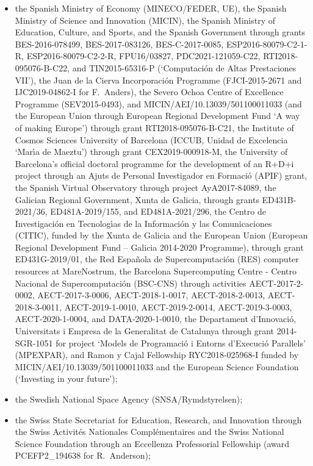 \documentclass{aa}
\begin{document}
\begin{appendix}
\begin{itemize}
\item the Spanish Ministry of Economy (MINECO/FEDER, UE), the Spanish Ministry of Science and Innovation (MICIN), the Spanish Ministry of Education, Culture, and Sports, and the Spanish Government through grants BES-2016-078499, BES-2017-083126, BES-C-2017-0085, ESP2016-80079-C2-1-R, ESP2016-80079-C2-2-R, FPU16/03827, PDC2021-121059-C22, RTI2018-095076-B-C22, and TIN2015-65316-P (`Computaci\'{o}n de Altas Prestaciones VII'), the Juan de la Cierva Incorporaci\'{o}n Programme (FJCI-2015-2671 and IJC2019-04862-I for F.~Anders), the Severo Ochoa Centre of Excellence Programme (SEV2015-0493), and MICIN/AEI/10.13039/501100011033 (and the European Union through European Regional Development Fund `A way of making Europe') through grant RTI2018-095076-B-C21, the Institute of Cosmos Sciences University of Barcelona (ICCUB, Unidad de Excelencia `Mar\'{\i}a de Maeztu’) through grant CEX2019-000918-M, the University of Barcelona's official doctoral programme for the development of an R+D+i project through an Ajuts de Personal Investigador en Formaci\'{o} (APIF) grant, the Spanish Virtual Observatory through project AyA2017-84089, the Galician Regional Government, Xunta de Galicia, through grants ED431B-2021/36, ED481A-2019/155, and ED481A-2021/296, the Centro de Investigaci\'{o}n en Tecnolog\'{\i}as de la Informaci\'{o}n y las Comunicaciones (CITIC), funded by the Xunta de Galicia and the European Union (European Regional Development Fund -- Galicia 2014-2020 Programme), through grant ED431G-2019/01, the Red Espa\~{n}ola de Supercomputaci\'{o}n (RES) computer resources at MareNostrum, the Barcelona Supercomputing Centre - Centro Nacional de Supercomputaci\'{o}n (BSC-CNS) through activities AECT-2017-2-0002, AECT-2017-3-0006, AECT-2018-1-0017, AECT-2018-2-0013, AECT-2018-3-0011, AECT-2019-1-0010, AECT-2019-2-0014, AECT-2019-3-0003, AECT-2020-1-0004, and DATA-2020-1-0010, the Departament d'Innovaci\'{o}, Universitats i Empresa de la Generalitat de Catalunya through grant 2014-SGR-1051 for project `Models de Programaci\'{o} i Entorns d'Execuci\'{o} Parallels' (MPEXPAR), and Ramon y Cajal Fellowship RYC2018-025968-I funded by MICIN/AEI/10.13039/501100011033 and the European Science Foundation (`Investing in your future');
\item the Swedish National Space Agency (SNSA/Rymdstyrelsen);
\item the Swiss State Secretariat for Education, Research, and Innovation through the Swiss Activit\'{e}s Nationales Compl\'{e}mentaires and the Swiss National Science Foundation through an Eccellenza Professorial Fellowship (award PCEFP2\_194638 for R.~Anderson);

\end{itemize}
\end{appendix}
\end{document}
